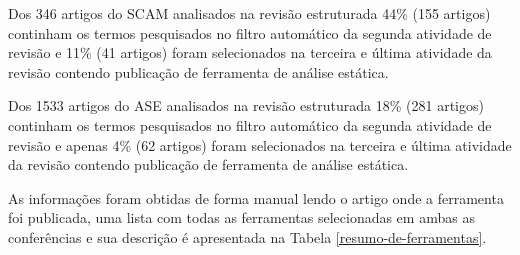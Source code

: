 Dos 346 artigos do SCAM analisados na revisão estruturada 44\% (155 artigos)
continham os termos pesquisados no filtro automático da segunda atividade de
revisão e 11\% (41 artigos) foram selecionados na terceira e última atividade
da revisão contendo publicação de ferramenta de análise estática.

Dos 1533 artigos do ASE analisados na revisão estruturada 18\% (281 artigos)
continham os termos pesquisados no filtro automático da segunda atividade de
revisão e apenas 4\% (62 artigos) foram selecionados na terceira e última
atividade da revisão contendo publicação de ferramenta de análise estática.

As informações foram obtidas de forma manual lendo o artigo onde a ferramenta foi publicada,
uma lista com todas as ferramentas selecionadas em ambas as conferências e sua descrição
é apresentada na Tabela \ref{resumo-de-ferramentas}.

